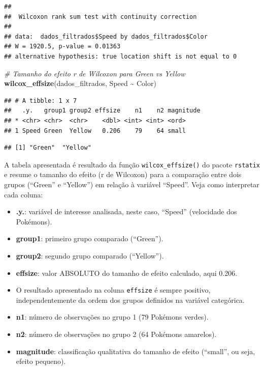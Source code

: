 \documentclass[
]{book}
\newenvironment{Shaded}{\begin{snugshade}}{\end{snugshade}}
\newcommand{\CommentTok}[1]{\textcolor[rgb]{0.56,0.35,0.01}{\textit{#1}}}
\newcommand{\FunctionTok}[1]{\textcolor[rgb]{0.13,0.29,0.53}{\textbf{#1}}}
\newcommand{\NormalTok}[1]{#1}
\newcommand{\SpecialCharTok}[1]{\textcolor[rgb]{0.81,0.36,0.00}{\textbf{#1}}}
\providecommand{\tightlist}{%
  \setlength{\itemsep}{0pt}\setlength{\parskip}{0pt}}
\begin{document}
\begin{verbatim}
## 
##  Wilcoxon rank sum test with continuity correction
## 
## data:  dados_filtrados$Speed by dados_filtrados$Color
## W = 1920.5, p-value = 0.01363
## alternative hypothesis: true location shift is not equal to 0
\end{verbatim}

\begin{Shaded}
\begin{Highlighting}[]
\CommentTok{\# Tamanho do efeito r de Wilcoxon para Green vs Yellow}
\FunctionTok{wilcox\_effsize}\NormalTok{(dados\_filtrados, Speed }\SpecialCharTok{\textasciitilde{}}\NormalTok{ Color)}
\end{Highlighting}
\end{Shaded}

\begin{verbatim}
## # A tibble: 1 x 7
##   .y.   group1 group2 effsize    n1    n2 magnitude
## * <chr> <chr>  <chr>    <dbl> <int> <int> <ord>    
## 1 Speed Green  Yellow   0.206    79    64 small
\end{verbatim}

\begin{Shaded}
\end{Shaded}

\begin{verbatim}
## [1] "Green"  "Yellow"
\end{verbatim}

A tabela apresentada é resultado da função \texttt{wilcox\_effsize()} do pacote \texttt{rstatix} e resume o tamanho do efeito (r de Wilcoxon) para a comparação entre dois grupos (``Green'' e ``Yellow'') em relação à variável ``Speed''. Veja como interpretar cada coluna:

\begin{itemize}
\tightlist
\item
  \textbf{.y.}: variável de interesse analisada, neste caso, ``Speed'' (velocidade dos Pokémons).
\item
  \textbf{group1}: primeiro grupo comparado (``Green'').
\item
  \textbf{group2}: segundo grupo comparado (``Yellow'').
\item
  \textbf{effsize}: valor ABSOLUTO do tamanho de efeito calculado, aqui 0.206.\\
\item
  O resultado apresentado na coluna \texttt{effsize} é sempre positivo, independentemente da ordem dos grupos definidos na variável categórica.
\item
  \textbf{n1}: número de observações no grupo 1 (79 Pokémons verdes).
\item
  \textbf{n2}: número de observações no grupo 2 (64 Pokémons amarelos).
\item
  \textbf{magnitude}: classificação qualitativa do tamanho de efeito (``small'', ou seja, efeito pequeno).
\end{itemize}
\end{document}
